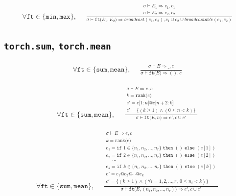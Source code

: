 \documentclass{article}
\makeatletter
\newcommand{\Rar}{\Rightarrow}
\newcommand{\mtt}[1]{\mathtt{#1}}
\newcommand{\bigspace}{\,\,\,\,\,\,\,\,}
\newcommand{\op}[2]{\mtt{#1(}#2\mtt{)}}
\newcommand{\conc}{\mtt{@}}
\newcommand{\indr}[2]{\mtt{[}#1\mtt{:}#2\mtt{]}}
\newcommand{\ifs}[3]{\mtt{if}\,\,#1\,\,\mtt{then}\,\,#2\,\,\mtt{else}\,\,#3}
\makeatother
\begin{document}
\begin{align*}
  \forall \mtt{ft} \in \{\mtt{min}, \mtt{max}\},
  \bigspace
  \frac
  {
    \begin{array}{l}
      \sigma \vdash E_1 \Rar e_1, c_1 \\
      \sigma \vdash E_2 \Rar e_2, c_2
    \end{array}
  }
  {
    \sigma \vdash \op{ft}{E_1, E_2} \Rar broadcast(e_1, e_2),
      c_1 \cup c_2 \cup broadcastable(e_1, e_2)
  }
\end{align*}%

\subsection*{\texttt{torch.sum}, \texttt{torch.mean}}%
\begin{align*}
  \forall \mtt{ft} \in \{\mtt{sum}, \mtt{mean}\},
  \bigspace
  \frac
  {
    \begin{array}{l}
      \sigma \vdash E \Rar \_, c
    \end{array}
  }
  {
    \sigma \vdash \op{ft}{E} \Rar (), c
  }
\end{align*}

\begin{align*}
  \forall \mtt{ft} \in \{\mtt{sum}, \mtt{mean}\},
  \bigspace
  \frac
  {
    \begin{array}{l}
      \sigma \vdash E \Rar e, c \\
      k = \op{rank}{e} \\
      e' = e \indr{1}{n} \conc e \indr{n+2}{k} \\
      c' = \{ (k \geq 1) \land (0 \leq n < k) \}
    \end{array}
  }
  {
    \sigma \vdash \op{ft}{E, n} \Rar e', c \cup c'
  }
\end{align*}

\begin{align*}
  \forall \mtt{ft} \in \{\mtt{sum}, \mtt{mean}\},
  \bigspace
  \frac
  {
    \begin{array}{l}
      \sigma \vdash E \Rar e, c \\
      k = \op{rank}{e} \\
      e_1 = \ifs{1 \in \{n_1, n_2, \dots, n_r\}}{()}{(e[1])} \\
      e_2 = \ifs{2 \in \{n_1, n_2, \dots, n_r\}}{()}{(e[2])} \\
      \bigspace \cdots \\
      e_k = \ifs{k \in \{n_1, n_2, \dots, n_r\}}{()}{(e[k])} \\
      e' = e_1 \conc e_2 \conc \cdots \conc e_k \\
      c' = \{ (k \geq 1) \land (\forall i=1, 2, \dots, r,\: 0 \leq n_i < k) \}
    \end{array}
  }
  {
    \sigma \vdash \op{ft}{E, (n_1, n_2, \dots, n_r)} \Rar e', c \cup c'
  }
\end{align*}
\end{document}
